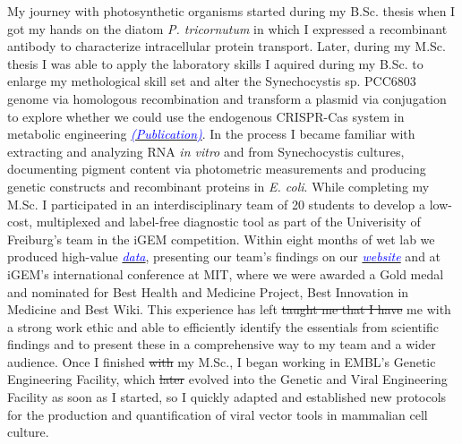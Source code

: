 \documentclass[11pt,a4paper,sans]{moderncv}
\begin{document}
\begin{spacing}{1.15}
\par\vspace*{1mm}

My journey with photosynthetic organisms started during my B.Sc. thesis when I got my hands on the diatom \textit{P. tricornutum} in which I expressed a recombinant antibody to characterize intracellular protein transport. 
Later, during my M.Sc. thesis I was able to apply the laboratory skills I aquired during my B.Sc. to enlarge my methological skill set and alter the Synechocystis sp. PCC6803 genome via homologous recombination and transform a plasmid via conjugation to explore whether we could use the endogenous CRISPR-Cas system in metabolic engineering {\href{https://www.tandfonline.com/eprint/vmAQ3vjYGdZIZpIKQTIT/full}{\textcolor{blue}{{\textit{(Publication)}}}}}. 
In the process I became familiar with extracting and analyzing RNA \textit{in vitro} and from Synechocystis cultures, documenting pigment content via photometric measurements and producing genetic constructs and recombinant proteins in \textit{E. coli}. 
While completing my M.Sc. I participated in an interdisciplinary team of 20 students to develop a low-cost, multiplexed and label-free diagnostic tool as part of the Univerisity of Freiburg's team in the iGEM competition.
Within eight months of wet lab we produced high-value {\href{https://www.ncbi.nlm.nih.gov/pubmed/29803867}{\textcolor{blue}{\textit{data}}}}, presenting our team's findings on our {\href{http://2015.igem.org/Team:Freiburg}{\textcolor{blue}{\textit{website}}}} and at iGEM's international conference at MIT, where we were awarded a Gold medal and nominated for Best Health and Medicine Project, Best Innovation in Medicine and Best Wiki.
This experience has left \sout{taught me that I have} me with a strong work ethic and able to efficiently identify the essentials from scientific findings and to present these in a comprehensive way to my team and a wider audience.
Once I finished \sout{with} my M.Sc., I began working in EMBL's Genetic Engineering Facility, which \sout {later} evolved into the Genetic and Viral Engineering Facility as soon as I started, so I quickly adapted and established new protocols for the production and quantification of viral vector tools in mammalian cell culture. 			

\end{spacing}
\end{document}
